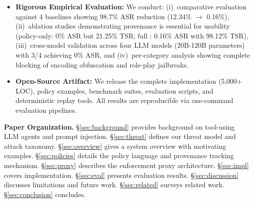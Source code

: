 \begin{itemize}[leftmargin=1.2em]
  \item \textbf{Rigorous Empirical Evaluation:} We conduct: (i)~comparative evaluation against 4
        baselines showing 98.7\% ASR reduction (12.34\% $\rightarrow$ 0.16\%), (ii)~ablation studies demonstrating provenance is essential for usability (policy-only: 0\% ASR but 21.25\% TSR; full \sys{}: 0.16\% ASR with 98.12\% TSR), (iii)~cross-model validation across four LLM models (20B-120B parameters) with 3/4 achieving 0\% ASR, and (iv)~per-category analysis showing complete blocking of encoding obfuscation and role-play jailbreaks.
  
  \item \textbf{Open-Source Artifact:} We release the complete \sys{} implementation (5,000+ LOC),
        policy examples, benchmark suites, evaluation scripts, and deterministic replay tools. All
        results are reproducible via one-command evaluation pipelines.
\end{itemize}

\textbf{Paper Organization.}
\S\ref{sec:background} provides background on tool-using LLM agents and prompt injection.
\S\ref{sec:threat} defines our threat model and attack taxonomy.
\S\ref{sec:overview} gives a system overview with motivating examples.
\S\ref{sec:policies} details the policy language and provenance tracking mechanism.
\S\ref{sec:proxy} describes the enforcement proxy architecture.
\S\ref{sec:impl} covers implementation.
\S\ref{sec:eval} presents evaluation results.
\S\ref{sec:discussion} discusses limitations and future work.
\S\ref{sec:related} surveys related work.
\S\ref{sec:conclusion} concludes.

